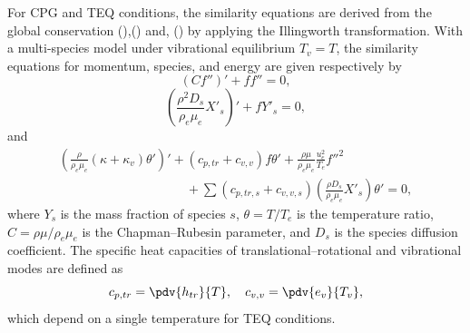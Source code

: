 For \gls{CPG} and \gls{TEQ} conditions, the similarity equations are derived from the global conservation (),() and, () by applying the Illingworth transformation. With a multi-species model under vibrational equilibrium $T_v = T$, the similarity equations for momentum, species, and energy are given respectively by
\begin{equation}\label{equation:similarity:momentum}
    (C f'')' + f f'' = 0,
\end{equation}
\begin{equation}\label{equation:similarity:species}
    \left(\frac{\rho^2 D_s}{\rho_e \mu_e} X'_s\right)' + f Y'_s = 0,
\end{equation}
and
\begin{multline}\label{equation:similarity:teq_energy}
     \left(\frac{\rho}{\rho_e \mu_e} (\kappa + \kappa_v) \theta'\right)' + (c_{p,tr} + c_{v,v}) f \theta' + \frac{\rho \mu}{\rho_e \mu_e} \frac{u_{e}^{2}}{T_e} f''^{2} \\
     \qquad\qquad\qquad\qquad\qquad + \sum (c_{p,tr,s} + c_{v,v,s}) \left(\frac{\rho D_s}{\rho_e \mu_e} X'_s\right) \theta' = 0,
\end{multline}
where $Y_s$ is the mass fraction of species $s$, $\theta = T/T_e$ is the temperature ratio, $C = \rho\mu/\rho_e\mu_e$ is the Chapman--Rubesin parameter, and $D_s$ is the species diffusion coefficient. The specific heat capacities of translational--rotational and vibrational modes are defined as
\begin{equation}
    c_{p,tr} = \pdv{h_{tr}}{T}, \quad c_{v,v} = \pdv{e_{v}}{T_{v}},
\end{equation}
which depend on a single temperature for \gls{TEQ} conditions.



